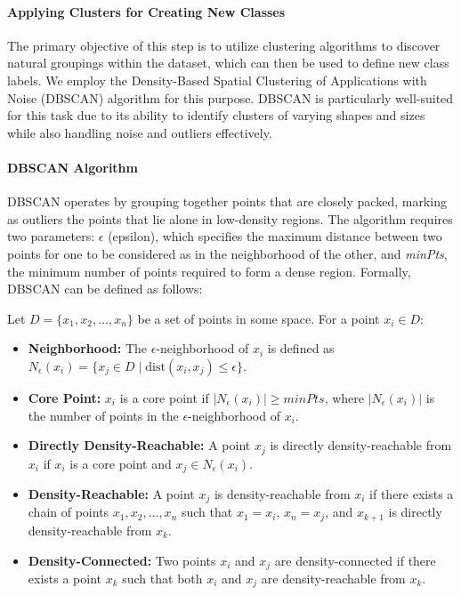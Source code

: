 \paragraph{Applying Clusters for Creating New Classes}
The primary objective of this step is to utilize clustering algorithms to discover natural groupings within the dataset, which can then be used to define new class labels. We employ the Density-Based Spatial Clustering of Applications with Noise (DBSCAN) algorithm for this purpose. DBSCAN is particularly well-suited for this task due to its ability to identify clusters of varying shapes and sizes while also handling noise and outliers effectively.

\paragraph{DBSCAN Algorithm}
DBSCAN operates by grouping together points that are closely packed, marking as outliers the points that lie alone in low-density regions. The algorithm requires two parameters: \(\epsilon\) (epsilon), which specifies the maximum distance between two points for one to be considered as in the neighborhood of the other, and \textit{minPts}, the minimum number of points required to form a dense region. Formally, DBSCAN can be defined as follows:

Let \(D = \{x_1, x_2, \ldots, x_n\}\) be a set of points in some space. For a point \(x_i \in D\):

\begin{itemize}
    \item \textbf{Neighborhood:} The \(\epsilon\)-neighborhood of \(x_i\) is defined as \(N_{\epsilon}(x_i) = \{x_j \in D \mid \text{dist}(x_i, x_j) \leq \epsilon\}\).
    
    \item \textbf{Core Point:} \(x_i\) is a core point if \(|N_{\epsilon}(x_i)| \geq \textit{minPts}\), where \(|N_{\epsilon}(x_i)|\) is the number of points in the \(\epsilon\)-neighborhood of \(x_i\).
    
    \item \textbf{Directly Density-Reachable:} A point \(x_j\) is directly density-reachable from \(x_i\) if \(x_i\) is a core point and \(x_j \in N_{\epsilon}(x_i)\).
    
    \item \textbf{Density-Reachable:} A point \(x_j\) is density-reachable from \(x_i\) if there exists a chain of points \(x_1, x_2, \ldots, x_n\) such that \(x_1 = x_i\), \(x_n = x_j\), and \(x_{k+1}\) is directly density-reachable from \(x_k\).
    
    \item \textbf{Density-Connected:} Two points \(x_i\) and \(x_j\) are density-connected if there exists a point \(x_k\) such that both \(x_i\) and \(x_j\) are density-reachable from \(x_k\).
\end{itemize}

